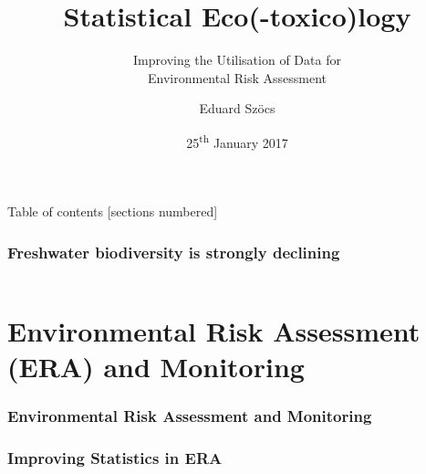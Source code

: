\documentclass[
	10pt
	]{beamer}
\title{Statistical Eco(-toxico)logy}
\subtitle{Improving the Utilisation of Data for\\Environmental Risk Assessment}
\date{25\textsuperscript{th} January 2017}
\author{Eduard Sz\"{o}cs}
\begin{document}
\maketitle

\begin{frame}{Table of contents}
  [sections numbered]
  \tableofcontents[hideallsubsections]
\end{frame}


{%
\begin{frame}[t]
\frametitle{Freshwater biodiversity is strongly declining}
	\begin{columns}[T]
	\end{columns}
\end{frame}
}




\section[Environmental Risk Assessment and Environmental Monitoring
]{Environmental Risk Assessment (ERA) and Monitoring}

\begin{frame}
\frametitle{Environmental Risk Assessment and Monitoring}
 \resizebox{11.5cm}{!}{%
				
				}
\end{frame}


\begin{frame}[noframenumbering]
\frametitle{Improving Statistics in ERA}
 \resizebox{11.5cm}{!}{%
				
				}
\end{frame}
\end{document}
